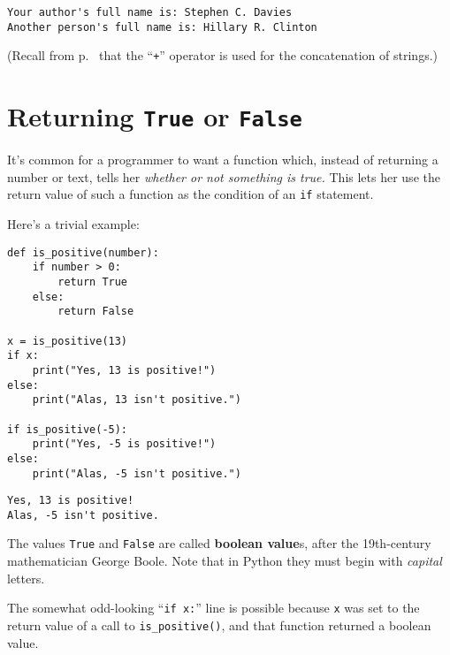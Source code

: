 \begin{Verbatim}[fontsize=\small,samepage=true,frame=leftline,framesep=5mm,framerule=1mm]
Your author's full name is: Stephen C. Davies
Another person's full name is: Hillary R. Clinton
\end{Verbatim}

(Recall from p.~\pageref{concatenatingStrings} that the ``\texttt{+}'' operator
is used for the concatenation of strings.)

\section{Returning \texttt{True} or \texttt{False}}

It's common for a programmer to want a function which, instead of returning a
number or text, tells her \textit{whether or not something is true.} This lets
her use the return value of such a function as the condition of an \texttt{if}
statement.

Here's a trivial example:

\begin{Verbatim}[fontsize=\small,samepage=true,frame=single,framesep=3mm]
def is_positive(number):
    if number > 0:
        return True
    else:
        return False

x = is_positive(13)
if x:
    print("Yes, 13 is positive!")
else:
    print("Alas, 13 isn't positive.")

if is_positive(-5):
    print("Yes, -5 is positive!")
else:
    print("Alas, -5 isn't positive.")
\end{Verbatim}
\vspace{-.2in}

\begin{Verbatim}[fontsize=\small,samepage=true,frame=leftline,framesep=5mm,framerule=1mm]
Yes, 13 is positive!
Alas, -5 isn't positive.
\end{Verbatim}

The values \texttt{True} and \texttt{False} are called \textbf{boolean value}s,
after the 19th-century mathematician George Boole. Note that in Python they
must begin with \textit{capital} letters.

The somewhat odd-looking ``\texttt{if x:}'' line is possible because \texttt{x}
was set to the return value of a call to \texttt{is\_positive()}, and that
function returned a boolean value.


